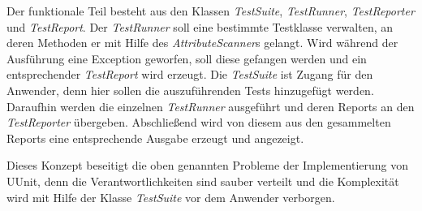 Der funktionale Teil besteht aus den Klassen \textit{TestSuite}, \textit{TestRunner}, \textit{TestReporter} und \textit{TestReport}. Der \textit{TestRunner} soll eine bestimmte Testklasse verwalten, an deren Methoden er mit Hilfe des \textit{AttributeScanner}s gelangt. Wird während der Ausführung eine Exception geworfen, soll diese gefangen werden und ein entsprechender \textit{TestReport} wird erzeugt. Die \textit{TestSuite} ist Zugang für den Anwender, denn hier sollen die auszuführenden Tests hinzugefügt werden. Daraufhin werden die einzelnen \textit{TestRunner} ausgeführt und deren Reports an den \textit{TestReporter} übergeben. Abschließend wird von diesem aus den gesammelten Reports eine entsprechende Ausgabe erzeugt und angezeigt.

Dieses Konzept beseitigt die oben genannten Probleme der Implementierung von UUnit, denn die Verantwortlichkeiten sind sauber verteilt und die Komplexität wird mit Hilfe der Klasse \textit{TestSuite} vor dem Anwender verborgen.